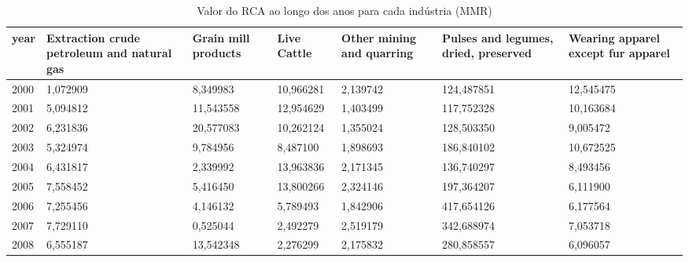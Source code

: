 \begin{table}
\centering
\caption{Valor do RCA ao longo dos anos para cada indústria (MMR)}
\begin{tabular}{p{1cm}p{2cm}p{2cm}p{2cm}p{2cm}p{2cm}p{2cm}}
\toprule
 year &  Extraction crude petroleum and natural gas &  Grain mill products &  Live Cattle &  Other mining and quarring &  Pulses and legumes, dried, preserved &  Wearing apparel except fur apparel \\
\midrule
 2000 &                                    1,072909 &             8,349983 &    10,966281 &                   2,139742 &                            124,487851 &                           12,545475 \\
 2001 &                                    5,094812 &            11,543558 &    12,954629 &                   1,403499 &                            117,752328 &                           10,163684 \\
 2002 &                                    6,231836 &            20,577083 &    10,262124 &                   1,355024 &                            128,503350 &                            9,005472 \\
 2003 &                                    5,324974 &             9,784956 &     8,487100 &                   1,898693 &                            186,840102 &                           10,672525 \\
 2004 &                                    6,431817 &             2,339992 &    13,963836 &                   2,171345 &                            136,740297 &                            8,493456 \\
 2005 &                                    7,558452 &             5,416450 &    13,800266 &                   2,324146 &                            197,364207 &                            6,111900 \\
 2006 &                                    7,255456 &             4,146132 &     5,789493 &                   1,842906 &                            417,654126 &                            6,177564 \\
 2007 &                                    7,729110 &             0,525044 &     2,492279 &                   2,519179 &                            342,688974 &                            7,053718 \\
 2008 &                                    6,555187 &            13,542348 &     2,276299 &                   2,175832 &                            280,858557 &                            6,096057 \\

\end{tabular}
\end{table}
